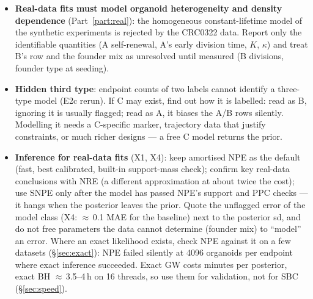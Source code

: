 \documentclass[10pt,a4paper]{article}
\begin{document}
\begin{itemize}
\item \textbf{Real-data fits must model organoid heterogeneity and density dependence} (Part~\ref{part:real}): the homogeneous constant-lifetime model of the synthetic experiments is rejected by the CRC0322 data. Report only the identifiable quantities (A self-renewal, A's early division time, $K$, $\kappa$) and treat B's row and the founder mix as unresolved until measured (B divisions, founder type at seeding).
\item \textbf{Hidden third type}: endpoint counts of two labels cannot identify a three-type model (E2c rerun). If C may exist, find out how it is labelled: read as B, ignoring it is usually flagged; read as A, it biases the A/B rows silently. Modelling it needs a C-specific marker, trajectory data that justify constraints, or much richer designs --- a free C model returns the prior.
\item \textbf{Inference for real-data fits} (X1, X4): keep amortised NPE as the default (fast, best calibrated, built-in support-mass check); confirm key real-data conclusions with NRE (a different approximation at about twice the cost); use SNPE only after the model has passed NPE's support and PPC checks --- it hangs when the posterior leaves the prior. Quote the unflagged error of the model class (X4: $\approx$\,0.1 MAE for the baseline) next to the posterior sd, and do not free parameters the data cannot determine (founder mix) to ``model'' an error. Where an exact likelihood exists, check NPE against it on a few datasets (\S\ref{sec:exact}): NPE failed silently at 4096 organoids per endpoint where exact inference succeeded. Exact GW costs minutes per posterior, exact BH $\approx$\,3.5--4\,h on 16 threads, so use them for validation, not for SBC (\S\ref{sec:speed}).
\end{itemize}
\end{document}
